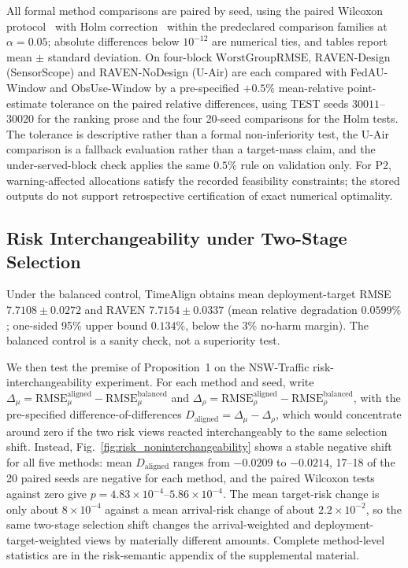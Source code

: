 \documentclass[letterpaper,journal]{IEEEtran}
\begin{document}
All formal method comparisons are paired by seed, using the paired Wilcoxon
protocol~\cite{wilcoxon1945individual} with Holm
correction~\cite{holm1979simple} within the predeclared comparison families at
$\alpha=0.05$; absolute differences below $10^{-12}$ are numerical ties, and
tables report mean $\pm$ standard deviation.  On four-block
$\mathrm{WorstGroupRMSE}$, RAVEN-Design (SensorScope) and RAVEN-NoDesign (U-Air)
are each compared with FedAU-Window and ObsUse-Window by a pre-specified $+0.5\%$
mean-relative point-estimate tolerance on the paired relative differences, using
TEST seeds $30011$--$30020$ for the ranking prose and the four 20-seed
comparisons for the Holm tests.  The tolerance is descriptive rather than a
formal non-inferiority test, the U-Air comparison is a fallback evaluation rather
than a target-mass claim, and the under-served-block check applies the same
$0.5\%$ rule on validation only.  For P2, warning-affected allocations satisfy
the recorded feasibility constraints; the stored outputs do not support
retrospective certification of exact numerical optimality.

\subsection{Risk Interchangeability under Two-Stage Selection}
\label{subsec:eval_rq1}

Under the balanced control, TimeAlign obtains mean deployment-target
RMSE $7.7108\pm0.0272$ and RAVEN $7.7154\pm0.0337$ (mean relative
degradation $0.0599\%$; one-sided 95\% upper bound $0.134\%$, below the
3\% no-harm margin).  The balanced control is a sanity check, not a superiority test.

We then test the premise of Proposition~1 on the NSW-Traffic
risk-interchangeability experiment.  For each method and seed, write
$\Delta_{\mu}=\mathrm{RMSE}_{\mu}^{\mathrm{aligned}}
-\mathrm{RMSE}_{\mu}^{\mathrm{balanced}}$ and
$\Delta_{\rho}=\mathrm{RMSE}_{\rho}^{\mathrm{aligned}}
-\mathrm{RMSE}_{\rho}^{\mathrm{balanced}}$, with the pre-specified
difference-of-differences $D_{\mathrm{aligned}}=\Delta_{\mu}-\Delta_{\rho}$,
which would concentrate around zero if the two risk views reacted
interchangeably to the same selection shift.  Instead,
Fig.~\ref{fig:risk_noninterchangeability} shows a stable negative shift for all
five methods: mean $D_{\mathrm{aligned}}$ ranges from $-0.0209$ to $-0.0214$,
17--18 of the 20 paired seeds are negative for each method, and the paired
Wilcoxon tests against zero give $p=4.83\times10^{-4}$--$5.86\times10^{-4}$.  The
mean target-risk change is only about $8\times10^{-4}$ against a mean arrival-risk
change of about $2.2\times10^{-2}$, so the same two-stage selection shift changes
the arrival-weighted and deployment-target-weighted views by materially different
amounts.  Complete method-level statistics are in the risk-semantic appendix of
the supplemental material.
\end{document}
